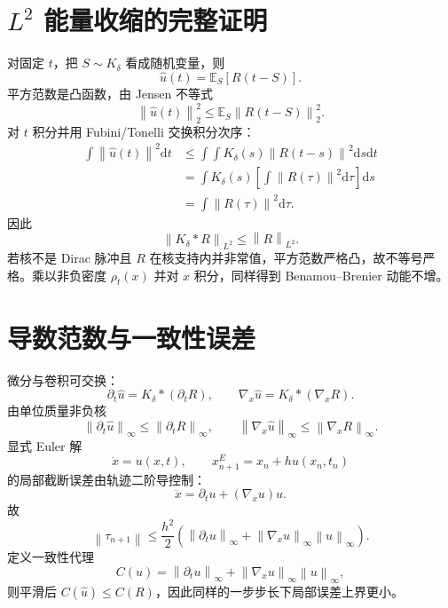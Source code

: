 \documentclass[UTF8,12pt,a4paper,fontset=none]{ctexart}
\numberwithin{equation}{section}
\newcommand{\E}{\mathbb{E}}
\newcommand{\norm}[1]{\left\lVert #1\right\rVert}
\newcommand{\dd}{\mathrm{d}}
\begin{document}
\section{$L^2$ 能量收缩的完整证明}
对固定 $t$，把 $S\sim K_\delta$ 看成随机变量，则
\begin{equation}
 \widehat u(t)=\E_S[R(t-S)].
\end{equation}
平方范数是凸函数，由 Jensen 不等式
\begin{equation}
 \norm{\widehat u(t)}_2^2
 \le\E_S\norm{R(t-S)}_2^2.
\end{equation}
对 $t$ 积分并用 Fubini/Tonelli 交换积分次序：
\begin{align}
 \int\norm{\widehat u(t)}^2\dd t
 &\le\int\int K_\delta(s)\norm{R(t-s)}^2\dd s\dd t\\
 &=\int K_\delta(s)\left[\int\norm{R(\tau)}^2\dd\tau\right]\dd s\\
 &=\int\norm{R(\tau)}^2\dd\tau.
\end{align}
因此
\begin{equation}
 \boxed{\norm{K_\delta*R}_{L^2}\le\norm{R}_{L^2}.}
\end{equation}
若核不是 Dirac 脉冲且 $R$ 在核支持内并非常值，平方范数严格凸，故不等号严格。乘以非负密度 $\rho_t(x)$ 并对 $x$ 积分，同样得到 Benamou--Brenier 动能不增。

\section{导数范数与一致性误差}
微分与卷积可交换：
\begin{equation}
 \partial_t\widehat u=K_\delta*(\partial_tR),
 \qquad
 \nabla_x\widehat u=K_\delta*(\nabla_xR).
\end{equation}
由单位质量非负核
\begin{equation}
 \norm{\partial_t\widehat u}_\infty
 \le\norm{\partial_tR}_\infty,
 \qquad
 \norm{\nabla_x\widehat u}_\infty
 \le\norm{\nabla_xR}_\infty.
\end{equation}
显式 Euler 解
\begin{equation}
 \dot x=u(x,t),\qquad
 x_{n+1}^{E}=x_n+h u(x_n,t_n)
\end{equation}
的局部截断误差由轨迹二阶导控制：
\begin{equation}
 \ddot x=\partial_tu+(\nabla_xu)u.
\end{equation}
故
\begin{equation}
 \norm{\tau_{n+1}}
 \le\frac{h^2}{2}
 \left(\norm{\partial_tu}_\infty
 +\norm{\nabla_xu}_\infty\norm{u}_\infty\right).
\end{equation}
定义一致性代理
\begin{equation}
 C(u)=\norm{\partial_tu}_\infty
 +\norm{\nabla_xu}_\infty\norm{u}_\infty,
\end{equation}
则平滑后 $C(\widehat u)\le C(R)$，因此同样的一步步长下局部误差上界更小。
\end{document}
